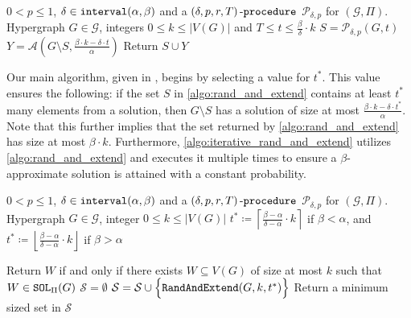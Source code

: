 \documentclass[letterpaper,11pt]{article}
\newcommand{\abs}[1]{{\left| #1\right|}}
\newcommand{\1}[1]{\mathds{1}\left[#1\right]}
\newcommand{\A}{{\mathcal{A}}}
\newcommand{\sat}{\textnormal{\texttt{SOL}}}
\newcommand{\randext}{\textnormal{\texttt{RandAndExtend}}}
\newcommand{\iterrandext}{\textnormal{\texttt{SamplingWithABlackBox}}}
\newcommand{\goodd}{\textnormal{\texttt{interval}}(\alpha, \beta)}
\newcommand{\procext}[4]{\left( #1, #2, #3, #4 \right)\textnormal{-\texttt{procedure}}}
\newcommand{\procalg}[2]{\mathcal{P}_{#1,#2}}
\begin{document}
\begin{algorithm}
	\begin{algorithmic}[1]
		\Configuration  $0 < p \leq 1$, $\delta \in \goodd$ and a $\procext{\delta}{p}{r}{T}$ $\procalg{\delta}{p}$ for $(\mathcal{G}, \Pi)$.		
		\Input Hypergraph $G \in \mathcal{G}$, integers $0 \leq k \leq \abs{V(G)}$ and $T \leq t \leq  \frac{\beta}{\delta} \cdot k $ 
			\State $S = \procalg{\delta}{p}(G,t)$
			\State $Y = \A\left( G \setminus S, \frac{\beta \cdot k - \delta \cdot t}{\alpha} \right)$
			\State Return $S \cup Y$
	\end{algorithmic}
	\caption{$\randext$}
	\label{algo:rand_and_extend}
\end{algorithm}


Our main algorithm, given in , begins by selecting a value for $t^*$.
This value ensures the following: if the set $S$ in \cref{algo:rand_and_extend} contains
at least $t^*$ many elements from a solution, then $G \setminus S$ has a solution of size at
most $\frac{\beta \cdot k - \delta \cdot t^*}{\alpha}$. Note that this further implies
that the set returned by \cref{algo:rand_and_extend} has size at most $\beta \cdot k$.
Furthermore, \cref{algo:iterative_rand_and_extend} 
utilizes \cref{algo:rand_and_extend} and
executes it multiple times to ensure a $\beta$-approximate solution is attained with a constant probability.
\begin{algorithm}
	\begin{algorithmic}[1]
		\Configuration  $0 < p \leq 1$, $\delta \in \goodd$ and a $\procext{\delta}{p}{r}{T}$ $\procalg{\delta}{p}$ for $(\mathcal{G}, \Pi)$.				
		\Input Hypergraph $G \in \mathcal{G}$, integer $0 \leq k \leq \abs{V(G)}$
		\State $t^* \coloneqq \left\lceil  \frac{\beta - \alpha}{\delta  -\alpha}  \cdot k  \right\rceil $ if $\beta<\alpha$, and $t^* \coloneqq \left\lfloor \frac{\beta - \alpha}{\delta  -\alpha}  \cdot k \right\rfloor $ if $\beta>\alpha$ \label{iterative:tstar}
			
			\State Return $W$ if and only if there exists $W \subseteq V(G)$ of size at most $k$ such that $W \in \sat_\Pi(G)$\label{line:W_at_most_k}
			\Else
			\State $\mathcal{S} = \emptyset$
			\label{line:for_loop_in_iter}
			\State $\mathcal{S} = \mathcal{S} \cup \Bigl\{\randext(G, k, t^*)\Bigr\} $
			\EndFor
			\State Return a minimum sized set in $\mathcal{S}$
			\EndIf
		\end{algorithmic}
		\caption{$\iterrandext$}
		\label{algo:iterative_rand_and_extend}
	\end{algorithm}
\end{document}
